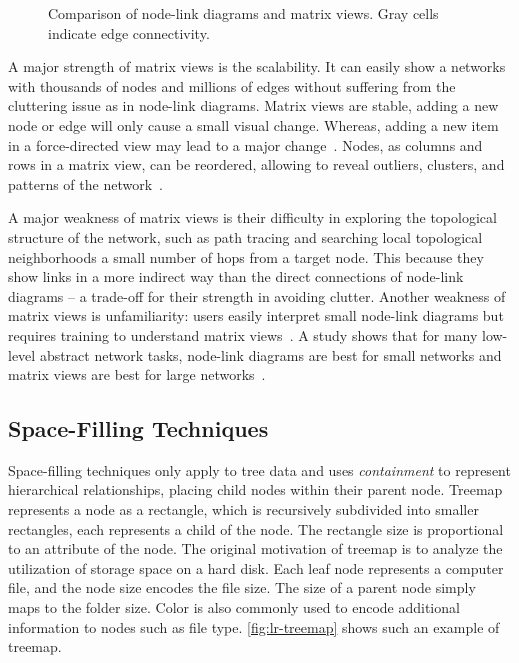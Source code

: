 \begin{figure}[!htb]
\centering
{}
\hfill
{}
\hfill
{}
\caption{Comparison of node-link diagrams and matrix views. Gray cells indicate edge connectivity. }
\label{fig:lr-matrix}
\end{figure}

A major strength of matrix views is the scalability. It can easily show a networks with thousands of nodes and millions of edges without suffering from the cluttering issue as in node-link diagrams. Matrix views are stable, adding a new node or edge will only cause a small visual change. Whereas, adding a new item in a force-directed view may lead to a major change~\cite{Munzner2014}. Nodes, as columns and rows in a matrix view, can be reordered, allowing to reveal outliers, clusters, and patterns of the network~\cite{Henry2007}.

A major weakness of matrix views is their difficulty in exploring the topological structure of the network, such as path tracing and searching local topological neighborhoods a small number of hops from a target node. This because they show links in a more indirect way than the direct connections of node-link diagrams -- a trade-off for their strength in avoiding clutter. Another weakness of matrix views is unfamiliarity: users easily interpret small node-link diagrams but requires training to understand matrix views~\cite{Munzner2014}. A study shows that for many low-level abstract network tasks, node-link diagrams are best for small networks and matrix views are best for large networks~\cite{Ghoniem2005}.

\subsection{Space-Filling Techniques}
Space-filling techniques only apply to tree data and uses \emph{containment} to represent hierarchical relationships, placing child nodes within their parent node. Treemap~\cite{Shneiderman1992} represents a node as a rectangle, which is recursively subdivided into smaller rectangles, each represents a child of the node. The rectangle size is proportional to an attribute of the node. The original motivation of treemap is to analyze the utilization of storage space on a hard disk. Each leaf node represents a computer file, and the node size encodes the file size. The size of a parent node simply maps to the folder size. Color is also commonly used to encode additional information to nodes such as file type. \autoref{fig:lr-treemap} shows such an example of treemap.


